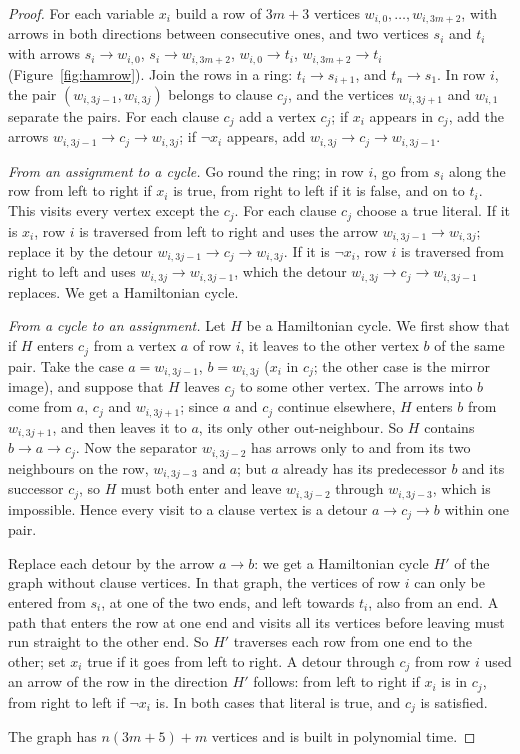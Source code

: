 \begin{proof}
For each variable $x_i$ build a row of $3m+3$ vertices $w_{i,0},\dots,w_{i,3m+2}$, with arrows in both directions between consecutive ones, and two vertices $s_i$ and $t_i$ with arrows $s_i\to w_{i,0}$, $s_i\to w_{i,3m+2}$, $w_{i,0}\to t_i$, $w_{i,3m+2}\to t_i$ (Figure~\ref{fig:hamrow}). Join the rows in a ring: $t_i\to s_{i+1}$, and $t_n\to s_1$. In row $i$, the pair $(w_{i,3j-1},w_{i,3j})$ belongs to clause $c_j$, and the vertices $w_{i,3j+1}$ and $w_{i,1}$ separate the pairs. For each clause $c_j$ add a vertex $c_j$; if $x_i$ appears in $c_j$, add the arrows $w_{i,3j-1}\to c_j\to w_{i,3j}$; if $\neg x_i$ appears, add $w_{i,3j}\to c_j\to w_{i,3j-1}$.

\emph{From an assignment to a cycle.} Go round the ring; in row $i$, go from $s_i$ along the row from left to right if $x_i$ is true, from right to left if it is false, and on to $t_i$. This visits every vertex except the $c_j$. For each clause $c_j$ choose a true literal. If it is $x_i$, row $i$ is traversed from left to right and uses the arrow $w_{i,3j-1}\to w_{i,3j}$; replace it by the detour $w_{i,3j-1}\to c_j\to w_{i,3j}$. If it is $\neg x_i$, row $i$ is traversed from right to left and uses $w_{i,3j}\to w_{i,3j-1}$, which the detour $w_{i,3j}\to c_j\to w_{i,3j-1}$ replaces. We get a Hamiltonian cycle.

\emph{From a cycle to an assignment.} Let $H$ be a Hamiltonian cycle. We first show that if $H$ enters $c_j$ from a vertex $a$ of row $i$, it leaves to the other vertex $b$ of the same pair. Take the case $a=w_{i,3j-1}$, $b=w_{i,3j}$ ($x_i$ in $c_j$; the other case is the mirror image), and suppose that $H$ leaves $c_j$ to some other vertex. The arrows into $b$ come from $a$, $c_j$ and $w_{i,3j+1}$; since $a$ and $c_j$ continue elsewhere, $H$ enters $b$ from $w_{i,3j+1}$, and then leaves it to $a$, its only other out-neighbour. So $H$ contains $b\to a\to c_j$. Now the separator $w_{i,3j-2}$ has arrows only to and from its two neighbours on the row, $w_{i,3j-3}$ and $a$; but $a$ already has its predecessor $b$ and its successor $c_j$, so $H$ must both enter and leave $w_{i,3j-2}$ through $w_{i,3j-3}$, which is impossible. Hence every visit to a clause vertex is a detour $a\to c_j\to b$ within one pair.

Replace each detour by the arrow $a\to b$: we get a Hamiltonian cycle $H'$ of the graph without clause vertices. In that graph, the vertices of row $i$ can only be entered from $s_i$, at one of the two ends, and left towards $t_i$, also from an end. A path that enters the row at one end and visits all its vertices before leaving must run straight to the other end. So $H'$ traverses each row from one end to the other; set $x_i$ true if it goes from left to right. A detour through $c_j$ from row $i$ used an arrow of the row in the direction $H'$ follows: from left to right if $x_i$ is in $c_j$, from right to left if $\neg x_i$ is. In both cases that literal is true, and $c_j$ is satisfied.

The graph has $n(3m+5)+m$ vertices and is built in polynomial time.
\end{proof}

